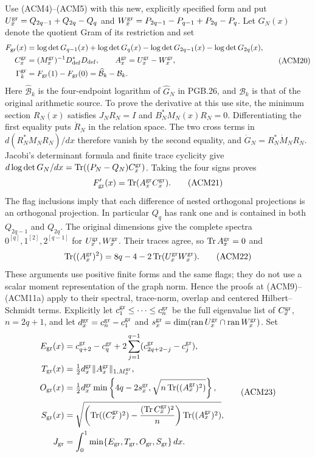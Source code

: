 Use (ACM4)--(ACM5) with this new, explicitly specified form and put
$U_x^{\rm gr}=Q_{2q-1}+Q_{2q}-Q_q$ and
$W_x^{\rm gr}=P_{2q-1}-P_{q-1}+P_{2q}-P_q$.
Let $G_N(x)$ denote the quotient Gram of its restriction and set
\[
 \begin{aligned}
 F_{\rm gr}(x)&=\log\det G_{q-1}(x)+\log\det G_q(x)
              -\log\det G_{2q-1}(x)-\log\det G_{2q}(x),\\
 C_x^{\rm gr}&=(M_x^{\rm gr})^{-1}D_{\rm def}^*D_{\rm def},
 \qquad A_x^{\rm gr}=U_x^{\rm gr}-W_x^{\rm gr},\\
 \Gamma_k^{\rm gr}&=F_{\rm gr}(1)-F_{\rm gr}(0)
                 =\widehat{\mathcal B}_k-\mathcal B_k.
 \end{aligned}
 \tag{ACM20}
\]
Here $\widehat{\mathcal B}_k$ is the four-endpoint logarithm of
$\widehat G_N$ in PGB.26, and $\mathcal B_k$ is that of the
original arithmetic source. To prove the derivative at this use
site, the minimum section $R_N(x)$ satisfies $J_NR_N=I$ and
$B_N^*M_N(x)R_N=0$. Differentiating the first equality puts
$\dot R_N$ in the relation space. The two cross terms in
$d(R_N^*M_NR_N)/dx$ therefore vanish by the second equality,
and $\dot G_N=R_N^*\dot M_NR_N$. Jacobi's determinant formula
and finite trace cyclicity give
$d\log\det G_N/dx=\operatorname{Tr}((P_N-Q_N)C_x^{\rm gr})$.
Taking the four signs proves
\[
 F_{\rm gr}'(x)=\operatorname{Tr}(A_x^{\rm gr}C_x^{\rm gr}).
 \tag{ACM21}
\]
The flag inclusions imply that each difference of nested
orthogonal projections is an orthogonal projection. In particular
$Q_q$ has rank one and is contained in both $Q_{2q-1}$ and
$Q_{2q}$. The original dimensions give the complete spectra
$0^{[q]},1^{[2]},2^{[q-1]}$ for $U_x^{\rm gr},W_x^{\rm gr}$.
Their traces agree, so $\operatorname{Tr}A_x^{\rm gr}=0$ and
\[
 \operatorname{Tr}((A_x^{\rm gr})^2)
       =8q-4-2\operatorname{Tr}(U_x^{\rm gr}W_x^{\rm gr}).
 \tag{ACM22}
\]
These arguments use positive finite forms and the same flags;
they do not use a scalar moment representation of the graph norm.
Hence the proofs at (ACM9)--(ACM11a) apply to their spectral,
trace-norm, overlap and centered Hilbert--Schmidt terms. Explicitly
let $c_1^{\rm gr}\leq\cdots\leq c_n^{\rm gr}$ be the full
eigenvalue list of $C_x^{\rm gr}$, $n=2q+1$, and let
$d_x^{\rm gr}=c_n^{\rm gr}-c_1^{\rm gr}$ and
$s_x^{\rm gr}=\dim(\operatorname{ran}U_x^{\rm gr}
\cap\operatorname{ran}W_x^{\rm gr})$. Set
\[
 \begin{aligned}
 E_{\rm gr}(x)&=c_{q+2}^{\rm gr}-c_q^{\rm gr}
  +2\sum_{j=1}^{q-1}(c_{2q+2-j}^{\rm gr}-c_j^{\rm gr}),\\
 T_{\rm gr}(x)&=\tfrac12 d_x^{\rm gr}
                   \|A_x^{\rm gr}\|_{1,M_x^{\rm gr}},\\
 O_{\rm gr}(x)&=\tfrac12d_x^{\rm gr}\min\left\{
 4q-2s_x^{\rm gr},\sqrt{n\operatorname{Tr}((A_x^{\rm gr})^2)}
                                                   \right\},\\
 S_{\rm gr}(x)&=\sqrt{\left(\operatorname{Tr}((C_x^{\rm gr})^2)
 -\frac{(\operatorname{Tr}C_x^{\rm gr})^2}{n}\right)
                   \operatorname{Tr}((A_x^{\rm gr})^2)},\\
 J_{\rm gr}&=\int_0^1\min\{E_{\rm gr},T_{\rm gr},O_{\rm gr},
                                                S_{\rm gr}\}\,dx.
 \end{aligned}
 \tag{ACM23}
\]
